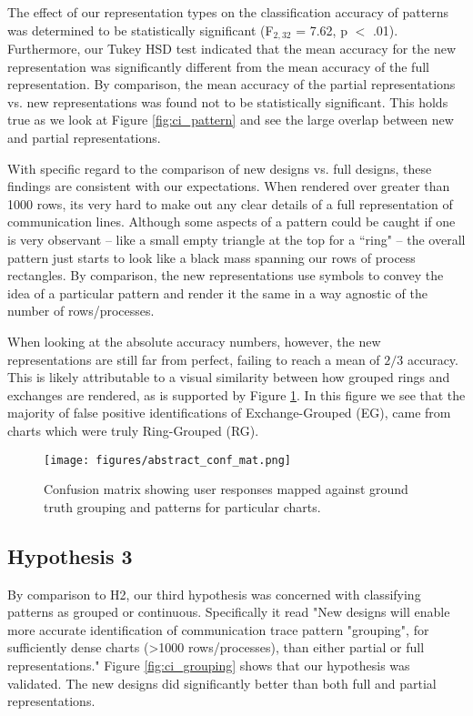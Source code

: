     The effect of our representation types on the classification accuracy of patterns was determined to be statistically significant (F$_{2,32}$ = 7.62, p $<$ .01). Furthermore, our Tukey HSD test indicated that the mean accuracy for the new representation was significantly different from the mean accuracy of the full representation. By comparison, the mean accuracy of the partial representations vs. new representations was found not to be statistically significant. This holds true as we look at Figure \ref{fig:ci_pattern} and see the large overlap between new and partial representations.

    With specific regard to the comparison of new designs vs. full designs, these findings are consistent with our expectations. When rendered over greater than 1000 rows, its very hard to make out any clear details of a full representation of communication lines. Although some aspects of a pattern could be caught if one is very observant -- like a small empty triangle at the top for a ``ring" -- the overall pattern just starts to look like a black mass spanning our rows of process rectangles. By comparison, the new representations use symbols to convey the idea of a particular pattern and render it the same in a way agnostic of the number of rows/processes. 
    
    When looking at the absolute accuracy numbers, however, the new representations are still far from perfect, failing to reach a mean of $2/3$ accuracy. This is likely attributable to a visual similarity between how grouped rings and exchanges are rendered, as is supported by Figure \ref{fig:abstract_conf_mat}. In this figure we see that the majority of false positive identifications of Exchange-Grouped (EG), came from charts which were truly Ring-Grouped (RG).
    
    \begin{figure}
        \centering
        \texttt{[image: figures/abstract\_conf\_mat.png]}
        \caption{Confusion matrix showing user responses mapped against ground truth grouping and patterns for particular charts.}
        \label{fig:abstract_conf_mat}
    \end{figure}
    
\subsection{Hypothesis 3}
    By comparison to H2, our third hypothesis was concerned with classifying patterns as grouped or continuous. Specifically it read "New designs will enable more accurate identification of communication trace pattern "grouping", for sufficiently dense charts (>1000 rows/processes), than either partial or full representations." Figure \ref{fig:ci_grouping} shows that our hypothesis was validated. The new designs did significantly better than both full and partial representations.
    
